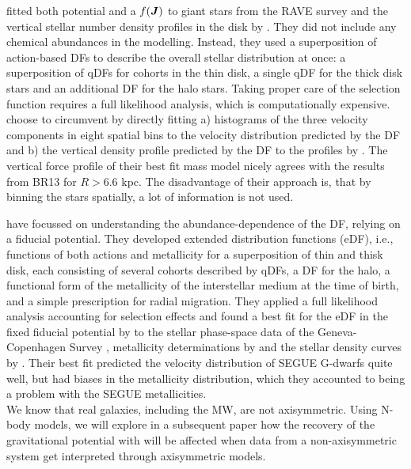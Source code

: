 \citet{2014MNRAS.445.3133P} fitted both potential and a $f(\boldsymbol{J})$ to giant stars from the RAVE survey \citep{2006AJ....132.1645S} and the vertical stellar number density profiles in the disk by \citet{2008ApJ...673..864J}. They did not include any chemical abundances in the modelling. Instead, they used a superposition of action-based DFs to describe the overall stellar distribution at once: a superposition of qDFs for cohorts in the thin disk, a single qDF for the thick disk stars and an additional DF for the halo stars. Taking proper care of the selection function requires a full likelihood analysis, which is computationally expensive. \citet{2014MNRAS.445.3133P} choose to circumvent by directly fitting a) histograms of the three velocity components in eight spatial bins to the velocity distribution predicted by the DF and b) the vertical density profile predicted by the DF to the profiles by \citet{2008ApJ...673..864J}. The vertical force profile of their best fit mass model nicely agrees with the results from BR13 for $R>6.6$ kpc. The disadvantage of their approach is, that by binning the stars spatially, a lot of information is not used.

\citet{2015MNRAS.449.3479S} have focussed on understanding the abundance-dependence of the DF, relying on a fiducial potential. They developed extended distribution functions (eDF), i.e., functions of both actions and metallicity for a superposition of thin and thisk disk, each consisting of several cohorts described by qDFs, a DF for the halo, a functional form of the metallicity of the interstellar medium at the time of birth, and a simple prescription for radial migration. They applied a full likelihood analysis accounting for selection effects and found a best fit for the eDF in the fixed fiducial potential by \citet{1998MNRAS.294..429D} to the stellar phase-space data of the Geneva-Copenhagen Survey \citep{2004A&A...418..989N,2009A&A...501..941H}, metallicity determinations by \citet{2011A&A...530A.138C} and the stellar density curves by \citet{1983MNRAS.202.1025G}. Their best fit predicted the velocity distribution of SEGUE G-dwarfs \citep{2014ApJS..211...17A} quite well, but had biases in the metallicity distribution, which they accounted to being a problem with the SEGUE metallicities. \\


We know that real galaxies, including the MW, are not axisymmetric. Using N-body models, we will explore in a subsequent paper how the recovery of the gravitational potential with \RM{} will be affected when data from a non-axisymmetric system get interpreted through axisymmetric models.

